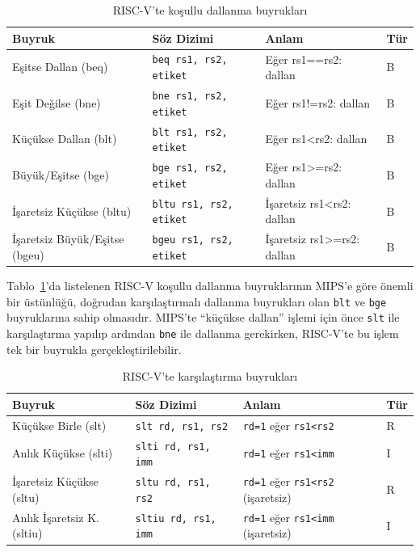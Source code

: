 \begin{table}[H]
\centering
\caption{RISC-V'te koşullu dallanma buyrukları}
\label{tab:dallanma-buyruklar}
\small
\begin{tabular}{llll}
\toprule
\textbf{Buyruk} & \textbf{Söz Dizimi} & \textbf{Anlam} & \textbf{Tür} \\
\midrule
Eşitse Dallan (beq)     & \texttt{beq rs1, rs2, etiket}  & Eğer rs1==rs2: dallan  & B \\
Eşit Değilse (bne)      & \texttt{bne rs1, rs2, etiket}  & Eğer rs1!=rs2: dallan  & B \\
Küçükse Dallan (blt)    & \texttt{blt rs1, rs2, etiket}  & Eğer rs1<rs2: dallan   & B \\
Büyük/Eşitse (bge)      & \texttt{bge rs1, rs2, etiket}  & Eğer rs1>=rs2: dallan  & B \\
İşaretsiz Küçükse (bltu) & \texttt{bltu rs1, rs2, etiket} & İşaretsiz rs1<rs2: dallan & B \\
İşaretsiz Büyük/Eşitse (bgeu) & \texttt{bgeu rs1, rs2, etiket} & İşaretsiz rs1>=rs2: dallan & B \\
\bottomrule
\end{tabular}
\end{table}

Tablo~\ref{tab:dallanma-buyruklar}'da listelenen RISC-V koşullu dallanma buyruklarının MIPS'e göre önemli bir üstünlüğü, doğrudan karşılaştırmalı dallanma buyrukları olan \texttt{blt} ve \texttt{bge} buyruklarına sahip olmasıdır. MIPS'te ``küçükse dallan'' işlemi için önce \texttt{slt} ile karşılaştırma yapılıp ardından \texttt{bne} ile dallanma gerekirken, RISC-V'te bu işlem tek bir buyrukla gerçekleştirilebilir.

\begin{table}[H]
\centering
\caption{RISC-V'te karşılaştırma buyrukları}
\label{tab:karsilastirma-buyruklar}
\begin{tabular}{llll}
\toprule
\textbf{Buyruk} & \textbf{Söz Dizimi} & \textbf{Anlam} & \textbf{Tür} \\
\midrule
Küçükse Birle (slt)  & \texttt{slt rd, rs1, rs2}  & \texttt{rd=1} eğer \texttt{rs1<rs2}  & R \\
Anlık Küçükse (slti) & \texttt{slti rd, rs1, imm} & \texttt{rd=1} eğer \texttt{rs1<imm}  & I \\
İşaretsiz Küçükse (sltu) & \texttt{sltu rd, rs1, rs2} & \texttt{rd=1} eğer \texttt{rs1<rs2} (işaretsiz) & R \\
Anlık İşaretsiz K. (sltiu) & \texttt{sltiu rd, rs1, imm} & \texttt{rd=1} eğer \texttt{rs1<imm} (işaretsiz) & I \\
\bottomrule
\end{tabular}
\end{table}

